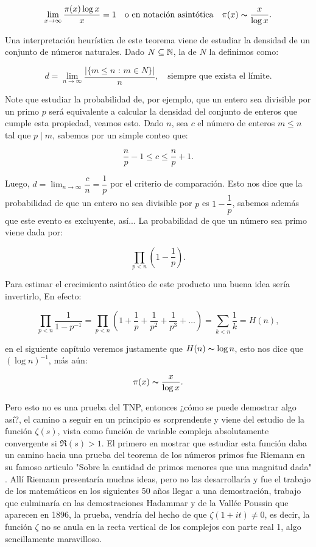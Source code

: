 $$\lim_{x \to \infty}\dfrac{\pi(x)\log x}{x}=1 \quad \text{o en notación asintótica} \quad \pi(x)\thicksim \dfrac{x}{\log x}.$$

Una interpretación heurística de este teorema viene de estudiar la densidad de un conjunto de números naturales. Dado $N\subseteq \mathbb{N}$, la  de $N$ la definimos como:

$$d=\lim_{n\to \infty}\frac{|\{m\leq n \text{ : }m\in N\}|}{n}, \quad \text{siempre que exista el límite}.$$

Note que estudiar la probabilidad de, por ejemplo, que un entero sea divisible por un primo $p$ será equivalente a calcular la densidad del conjunto de enteros que cumple esta propiedad, veamos esto. Dado $n$, sea  $c$ el número de enteros $m\leq n$ tal que $p\mid m$, sabemos por un simple conteo que:

$$\frac{n}{p}-1\leq c\leq\frac{n}{p}+1.$$

Luego, $d=\displaystyle\lim_{n \to \infty}\dfrac{c}{n}=\dfrac{1}{p}$ por el criterio de comparación. Esto nos dice que la probabilidad de que un entero no sea divisible por $p$ es $1-\dfrac{1}{p}$, sabemos además que este evento es excluyente, así... La probabilidad de que un número sea primo viene dada por:

$$\displaystyle\prod_{p<n}\left( 1-\frac{1}{p} \right).$$

Para estimar el crecimiento asintótico de este producto una buena idea sería invertirlo, En efecto:

$$\prod_{p<n} \dfrac{1}{1-p^{-1}}=\prod_{p<n} \left(1+\dfrac{1}{p}+\dfrac{1}{p^2}+\dfrac{1}{p^3}+\ldots\right)=\sum_{k<n}\frac{1}{k}=H(n),$$

en el siguiente capítulo veremos justamente que $H(n)\thicksim \log n$, esto nos dice que  $(\log n)^{-1}$, más aún:

$$\pi(x)\thicksim \dfrac{x}{\log x}.$$

Pero esto no es una prueba del TNP, entonces ¿cómo se puede demostrar algo así?, el camino a seguir en un principio es sorprendente y viene del estudio de la función $\zeta(s)$, vista como función de variable compleja absolutamente convergente si $\Re(s)>1$. El primero en mostrar que estudiar esta función daba un camino hacia una prueba del teorema de los números primos fue Riemann en su famoso articulo "Sobre la cantidad de primos menores que una magnitud dada"  \cite{riemann1990ueber}. Allí Riemann presentaría muchas ideas, pero no las desarrollaría y fue el trabajo de los matemáticos en los siguientes 50 años llegar a una demostración, trabajo que culminaría en las demostraciones Hadammar y de la Vallée Poussin que aparecen en 1896, la prueba, vendría del hecho de que $\zeta(1+it)\neq 0$, es decir, la función $\zeta$ no se anula en la recta vertical de los complejos con parte real 1, algo sencillamente maravilloso.\\

